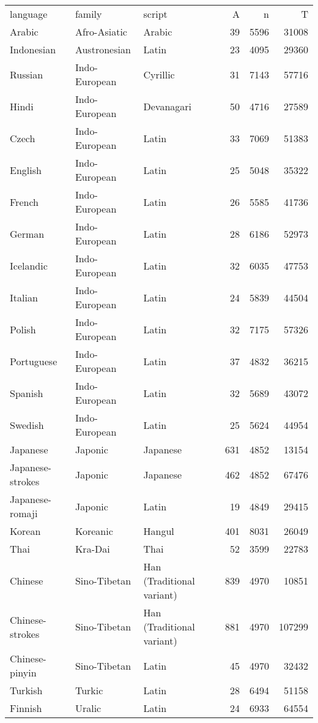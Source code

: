 \begin{table}[ht]
\centering
\begin{tabular}{lllrrr}
 language & family & script & A & n & T \\ 
 Arabic & Afro-Asiatic & Arabic &  39 & 5596 & 31008 \\ 
  Indonesian & Austronesian & Latin &  23 & 4095 & 29360 \\ 
  Russian & Indo-European & Cyrillic &  31 & 7143 & 57716 \\ 
  Hindi & Indo-European & Devanagari &  50 & 4716 & 27589 \\ 
  Czech & Indo-European & Latin &  33 & 7069 & 51383 \\ 
  English & Indo-European & Latin &  25 & 5048 & 35322 \\ 
  French & Indo-European & Latin &  26 & 5585 & 41736 \\ 
  German & Indo-European & Latin &  28 & 6186 & 52973 \\ 
  Icelandic & Indo-European & Latin &  32 & 6035 & 47753 \\ 
  Italian & Indo-European & Latin &  24 & 5839 & 44504 \\ 
  Polish & Indo-European & Latin &  32 & 7175 & 57326 \\ 
  Portuguese & Indo-European & Latin &  37 & 4832 & 36215 \\ 
  Spanish & Indo-European & Latin &  32 & 5689 & 43072 \\ 
  Swedish & Indo-European & Latin &  25 & 5624 & 44954 \\ 
  Japanese & Japonic & Japanese & 631 & 4852 & 13154 \\ 
  Japanese-strokes & Japonic & Japanese & 462 & 4852 & 67476 \\ 
  Japanese-romaji & Japonic & Latin &  19 & 4849 & 29415 \\ 
  Korean & Koreanic & Hangul & 401 & 8031 & 26049 \\ 
  Thai & Kra-Dai & Thai &  52 & 3599 & 22783 \\ 
  Chinese & Sino-Tibetan & Han (Traditional variant) & 839 & 4970 & 10851 \\ 
  Chinese-strokes & Sino-Tibetan & Han (Traditional variant) & 881 & 4970 & 107299 \\ 
  Chinese-pinyin & Sino-Tibetan & Latin &  45 & 4970 & 32432 \\ 
  Turkish & Turkic & Latin &  28 & 6494 & 51158 \\ 
  Finnish & Uralic & Latin &  24 & 6933 & 64554 \\ 
   \hline
\end{tabular}
\end{table}
